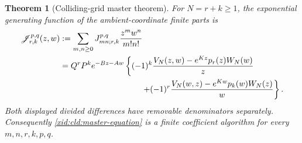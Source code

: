 \documentclass[11pt,a4paper]{article}
\numberwithin{equation}{section}
\newtheorem{theorem}{Theorem}[section]
\theoremstyle{definition}
\theoremstyle{remark}
\begin{document}
\begin{theorem}[Colliding-grid master theorem]
\label{xid:cld:master}
For $N=r+k\ge1$, the exponential generating function of the
ambient-coordinate finite parts is
\begin{align}
 \mathscr J_{r,k}^{p,q}(z,w)
 &: =\sum_{m,n\ge0}J_{mn;r,k}^{p,q}\frac{z^mw^n}{m!n!}\notag\\
 &=Q^rP^k e^{-Bz-Aw}\left\{
 (-1)^k\frac{V_N(z,w)-e^{Kz}p_r(z)W_N(w)}{z}\right.\notag\\
 &\hspace{35mm}\left.
 +(-1)^r\frac{V_N(w,z)-e^{Kw}p_k(w)W_N(z)}{w}
                                      \right\}.
 \label{xid:cld:master-equation}
\end{align}
Both displayed divided differences have removable denominators separately.
Consequently \eqref{xid:cld:master-equation} is a finite coefficient algorithm
for every $m,n,r,k,p,q$.
\end{theorem}
\end{document}
